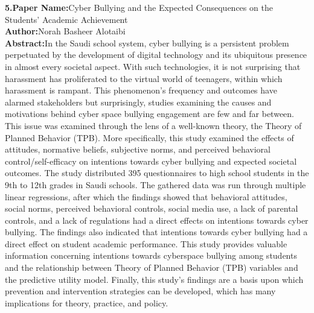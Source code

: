 \documentclass[oneside,a4paper,12pt]{report}
\begin{document}
\item \textbf{5.Paper Name:}Cyber Bullying and the Expected Consequences on the Students’ Academic Achievement\\
\textbf{Author:}Norah Basheer Alotaibi\\
\textbf{Abstract:}In the Saudi school system, cyber bullying is a persistent problem perpetuated by the development of digital technology and its ubiquitous presence in almost every societal aspect. With such technologies, it is not surprising that harassment has proliferated to the virtual world of teenagers, within which harassment is rampant. This phenomenon’s frequency and outcomes have alarmed stakeholders but surprisingly, studies examining the causes and motivations behind cyber space bullying engagement are few and far between. This issue was examined through the lens of a well-known theory, the Theory of Planned Behavior (TPB). More specifically, this study examined the effects of attitudes, normative beliefs, subjective norms, and perceived behavioral control/self-efficacy on intentions towards cyber bullying and expected societal outcomes. The study distributed 395 questionnaires to high school students in the 9th to 12th grades in Saudi schools. The gathered data was run through multiple linear regressions, after which the findings showed that behavioral attitudes, social norms, perceived behavioral controls, social media use, a lack of parental controls, and a lack of regulations had a direct effects on intentions towards cyber bullying. The findings also indicated that intentions towards cyber bullying had a direct effect on student academic performance. This study provides valuable information concerning intentions towards cyberspace bullying among students and the relationship between Theory of Planned Behavior (TPB) variables and the predictive utility model. Finally, this study’s findings are a basis upon which prevention and intervention strategies can be developed, which has many implications for theory, practice, and policy.  \\

\newpage
\end{document}
